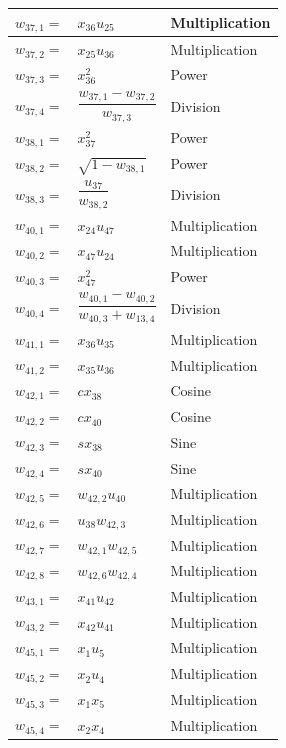 \begin{longtable}{|p{1.5cm}|l|p{2cm}|}
$w_{37,1}=$ & $ x_{36}u_{25} $ & Multiplication \\ \hline 
$w_{37,2}=$ & $ x_{25}u_{36} $ & Multiplication \\ \hline 
$w_{37,3}=$ & $ x_{36}^{2} $ & Power \\ \hline 
$w_{37,4}=$ & $ \dfrac{w_{37,1}-w_{37,2}}{w_{37,3}} $ & Division \\ \hline 
$w_{38,1}=$ & $ x_{37}^{2} $ & Power \\ \hline 
$w_{38,2}=$ & $ \sqrt{1-w_{38,1}} $ & Power \\ \hline 
$w_{38,3}=$ & $ \dfrac{u_{37}}{w_{38,2}} $ & Division \\ \hline 
$w_{40,1}=$ & $ x_{24}u_{47} $ & Multiplication \\ \hline 
$w_{40,2}=$ & $ x_{47}u_{24} $ & Multiplication \\ \hline 
$w_{40,3}=$ & $ x_{47}^{2} $ & Power \\ \hline
$w_{40,4}=$ & $ \dfrac{w_{40,1}-w_{40,2}}{w_{40,3}+w_{13,4}} $ & Division \\ \hline
$w_{41,1}=$ & $ x_{36}u_{35} $ & Multiplication \\ \hline 
$w_{41,2}=$ & $ x_{35}u_{36} $ & Multiplication \\ \hline 
$w_{42,1}=$ & $ cx_{38} $ & Cosine \\ \hline 
$w_{42,2}=$ & $ cx_{40} $ & Cosine \\ \hline 
$w_{42,3}=$ & $ sx_{38} $ & Sine \\ \hline 
$w_{42,4}=$ & $ sx_{40} $ & Sine \\ \hline 
$w_{42,5}=$ & $ w_{42,2}u_{40} $ & Multiplication \\ \hline 
$w_{42,6}=$ & $ u_{38}w_{42,3} $ & Multiplication\\ \hline 
$w_{42,7}=$ & $ w_{42,1}w_{42,5} $ & Multiplication \\ \hline 
$w_{42,8}=$ & $ w_{42,6}w_{42,4} $ & Multiplication \\ \hline 
$w_{43,1}=$ & $ x_{41}u_{42} $ & Multiplication \\ \hline 
$w_{43,2}=$ & $ x_{42}u_{41} $ & Multiplication \\ \hline 
$w_{45,1}=$ & $ x_{1}u_{5} $ & Multiplication \\ \hline 
$w_{45,2}=$ & $ x_{2}u_{4} $ & Multiplication \\ \hline 
$w_{45,3}=$ & $ x_{1}x_{5} $ & Multiplication \\ \hline 
$w_{45,4}=$ & $ x_{2}x_{4} $ & Multiplication \\ \hline 

\end{longtable}
